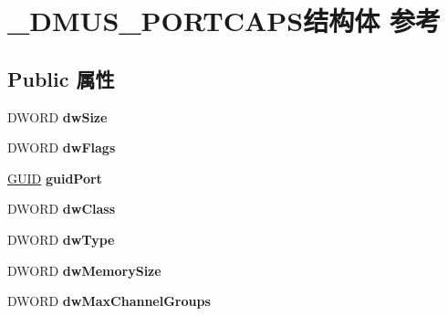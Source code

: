 \hypertarget{struct___d_m_u_s___p_o_r_t_c_a_p_s}{}\section{\+\_\+\+D\+M\+U\+S\+\_\+\+P\+O\+R\+T\+C\+A\+P\+S结构体 参考}
\label{struct___d_m_u_s___p_o_r_t_c_a_p_s}
\subsection*{Public 属性}
\begin{DoxyCompactItemize}
\item 
\mbox{\label{struct___d_m_u_s___p_o_r_t_c_a_p_s_aa526dbe9ffb42a9928fc06c3b1efdd7c}} 
D\+W\+O\+RD {\bfseries dw\+Size}
\item 
\mbox{\label{struct___d_m_u_s___p_o_r_t_c_a_p_s_a2026196f6b53083f0a83bada0b603949}} 
D\+W\+O\+RD {\bfseries dw\+Flags}
\item 
\mbox{\label{struct___d_m_u_s___p_o_r_t_c_a_p_s_a4ccd12065cc40226332c3fd533c63b4b}} 
\hyperlink{interface_g_u_i_d}{G\+U\+ID} {\bfseries guid\+Port}
\item 
\mbox{\label{struct___d_m_u_s___p_o_r_t_c_a_p_s_ae2a8637ee25783a36840c4385c879bc9}} 
D\+W\+O\+RD {\bfseries dw\+Class}
\item 
\mbox{\label{struct___d_m_u_s___p_o_r_t_c_a_p_s_ad2158bd3c8b6270e0eb0268f9aac4597}} 
D\+W\+O\+RD {\bfseries dw\+Type}
\item 
\mbox{\label{struct___d_m_u_s___p_o_r_t_c_a_p_s_abe5d6d6b2311f321d956b305f221bb67}} 
D\+W\+O\+RD {\bfseries dw\+Memory\+Size}
\item 
\mbox{\label{struct___d_m_u_s___p_o_r_t_c_a_p_s_abe2bfec06f9eef78ce02c0ee4df93060}} 
D\+W\+O\+RD {\bfseries dw\+Max\+Channel\+Groups}
\item 
\mbox{\label{struct___d_m_u_s___p_o_r_t_c_a_p_s_a6c47131bce2184c4d32441de9dbe8e74}} 

\end{DoxyCompactItemize}
